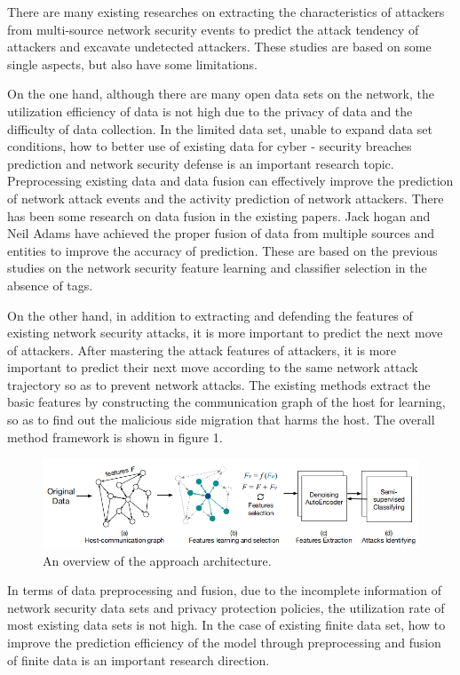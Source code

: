 \documentclass[12pt,journal,draftcls,doublespace, letterpaper,onecolumn]{IEEEtran}
\begin{document}
There are many existing researches on extracting the characteristics of attackers from multi-source network security events to predict the attack tendency of attackers and excavate undetected attackers. These studies are based on some single aspects, but also have some limitations.

On the one hand, although there are many open data sets on the network, the utilization efficiency of data is not high due to the privacy of data and the difficulty of data collection. In the limited data set, unable to expand data set conditions, how to better use of existing data for cyber - security breaches prediction and network security defense is an important research topic. Preprocessing existing data and data fusion can effectively improve the prediction of network attack events and the activity prediction of network attackers. There has been some research on data fusion in the existing papers. Jack hogan and Neil Adams have achieved the proper fusion of data from multiple sources and entities to improve the accuracy of prediction. These are based on the previous studies on the network security feature learning and classifier selection in the absence of tags.

On the other hand, in addition to extracting and defending the features of existing network security attacks, it is more important to predict the next move of attackers. After mastering the attack features of attackers, it is more important to predict their next move according to the same network attack trajectory so as to prevent network attacks. The existing methods extract the basic features by constructing the communication graph of the host for learning, so as to find out the malicious side migration that harms the host.
The overall method framework is shown in figure 1.

\begin{figure}[htbp]
	\centerline{\includegraphics{1.png}}
	\caption{ An overview of the approach architecture.}
	\label{fig}
\end{figure}

In terms of data preprocessing and fusion, due to the incomplete information of network security data sets and privacy protection policies, the utilization rate of most existing data sets is not high. In the case of existing finite data set, how to improve the prediction efficiency of the model through preprocessing and fusion of finite data is an important research direction.
\end{document}
